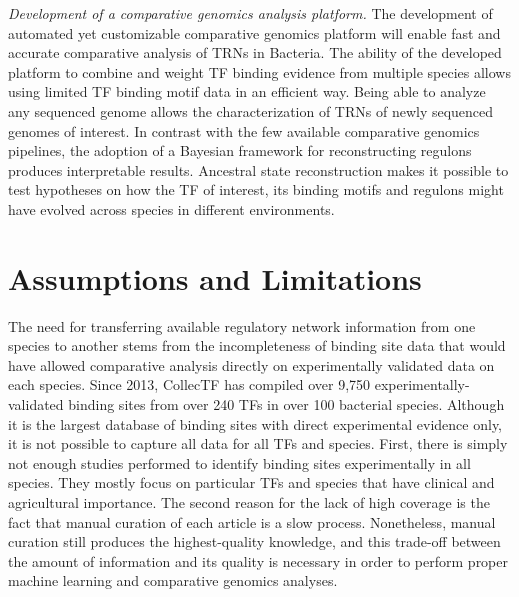 \textit{Development of a comparative genomics analysis platform.} The
development of automated yet customizable comparative genomics platform will
enable fast and accurate comparative analysis of TRNs in Bacteria. The ability
of the developed platform to combine and weight TF binding evidence from
multiple species allows using limited TF binding motif data in an efficient
way. Being able to analyze any sequenced genome allows the characterization of
TRNs of newly sequenced genomes of interest. In contrast with the few available
comparative genomics pipelines, the adoption of a Bayesian framework for
reconstructing regulons produces interpretable results. Ancestral state
reconstruction makes it possible to test hypotheses on how the TF of interest,
its binding motifs and regulons might have evolved across species in different
environments.

\section{Assumptions and Limitations}

The need for transferring available regulatory network information from one
species to another stems from the incompleteness of binding site data that
would have allowed comparative analysis directly on experimentally validated
data on each species. Since 2013, CollecTF has compiled over 9,750
experimentally-validated binding sites from over 240 TFs in over 100 bacterial
species. Although it is the largest database of binding sites with direct
experimental evidence only, it is not possible to capture all data for all TFs
and species. First, there is simply not enough studies performed to identify
binding sites experimentally in all species. They mostly focus on particular
TFs and species that have clinical and agricultural importance. The second reason
for the lack of high coverage is the fact that manual curation of each article
is a slow process. Nonetheless, manual curation still produces the highest-quality
knowledge, and this trade-off between the amount of information and its quality
is necessary in order to perform proper machine learning and comparative
genomics analyses.


